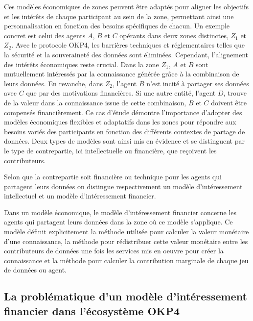 Ces modèles économiques de zones peuvent être adaptés pour aligner les objectifs et les intérêts de chaque participant au sein de la zone, permettant ainsi une personnalisation en fonction des besoins spécifiques de chacun.
Un exemple concret est celui des agents $A$, $B$ et $C$ opérants dans deux zones distinctes, $Z_1$ et $Z_2$. Avec le protocole OKP4, les barrières techniques et réglementaires telles que la sécurité et la souveraineté des données sont éliminées. Cependant, l'alignement des intérêts économiques reste crucial. Dans la zone $Z_1$, $A$ et $B$ sont mutuellement intéressés par la connaissance générée grâce à la combinaison de leurs données. En revanche, dans $Z_2$, l'agent $B$ n'est incité à partager ses données avec $C$ que par des motivations financières. Si une autre entité, l'agent $D$, trouve de la valeur dans la connaissance issue de cette combinaison, $B$ et $C$ doivent être compensés financièrement. Ce cas d'étude démontre l'importance d'adopter des modèles économiques flexibles et adaptatifs dans les zones pour répondre aux besoins variés des participants en fonction des différents contextes de partage de données. Deux types de modèles sont ainsi mis en évidence et se distinguent par le type de contrepartie, ici intellectuelle ou financière, que reçoivent les contributeurs.

Selon que la contrepartie soit financière ou technique pour les agents qui partagent leurs données on distingue respectivement un modèle d'intéressement intellectuel et un modèle d'intéressement financier.

Dans un modèle économique, le modèle d'intéressement financier concerne les agents qui partagent leurs données dans la zone où ce modèle s'applique. Ce modèle définit explicitement la méthode utilisée pour calculer la valeur monétaire d'une connaissance, la méthode pour rédistribuer cette valeur monétaire entre les contributeurs de données une fois les services mis en oeuvre pour créer la connaissance et la méthode pour calculer la contribution marginale de chaque jeu de données ou agent.

\subsection{La problématique d'un modèle d'intéressement financier dans l'écosystème OKP4}\label{subsec:problem}

